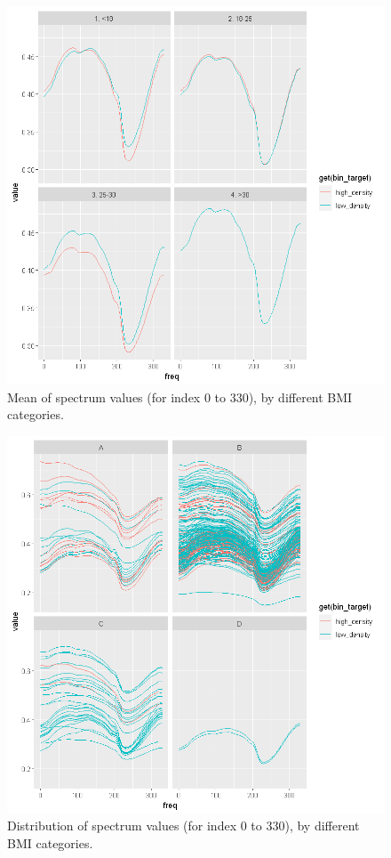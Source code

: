 \documentclass[letterpaper,11pt]{article}
\begin{document}
\begin{figure}[!htb]
	\centering
	\includegraphics[trim={0 0cm 0cm 0}, clip, scale=0.55]{figures/scio_by_bmi_mean.png}
	\caption{Mean of spectrum values (for index 0 to 330), by different BMI categories.} 
	\label{fig:scio_bmi_mean}
\end{figure}

\begin{figure}[!htb]
	\centering
	\includegraphics[trim={0 0cm 0cm 0}, clip, scale=0.55]{figures/scio_by_copa.png}
	\caption{Distribution of spectrum values (for index 0 to 330), by different BMI categories.} 
	\label{fig:scio_copa}
\end{figure}
\end{document}
